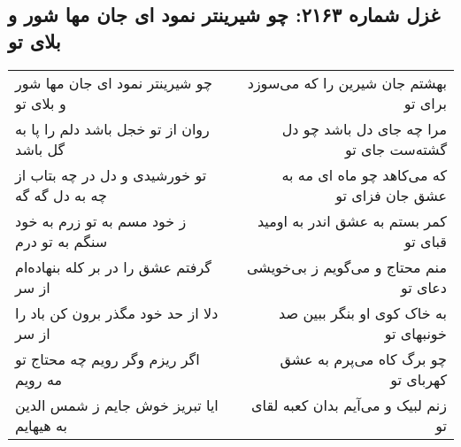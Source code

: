 \begin{center}
\section*{غزل شماره ۲۱۶۳: چو شیرینتر نمود ای جان مها شور و بلای تو}
\label{sec:2163}
\begin{longtable}{l p{0.5cm} r}
چو شیرینتر نمود ای جان مها شور و بلای تو
&&
بهشتم جان شیرین را که می‌سوزد برای تو
\\
روان از تو خجل باشد دلم را پا به گل باشد
&&
مرا چه جای دل باشد چو دل گشته‌ست جای تو
\\
تو خورشیدی و دل در چه بتاب از چه به دل گه گه
&&
که می‌کاهد چو ماه ای مه به عشق جان فزای تو
\\
ز خود مسم به تو زرم به خود سنگم به تو درم
&&
کمر بستم به عشق اندر به اومید قبای تو
\\
گرفتم عشق را در بر کله بنهاده‌ام از سر
&&
منم محتاج و می‌گویم ز بی‌خویشی دعای تو
\\
دلا از حد خود مگذر برون کن باد را از سر
&&
به خاک کوی او بنگر ببین صد خونبهای تو
\\
اگر ریزم وگر رویم چه محتاج تو مه رویم
&&
چو برگ کاه می‌پرم به عشق کهربای تو
\\
ایا تبریز خوش جایم ز شمس الدین به هیهایم
&&
زنم لبیک و می‌آیم بدان کعبه لقای تو
\\
\end{longtable}
\end{center}
